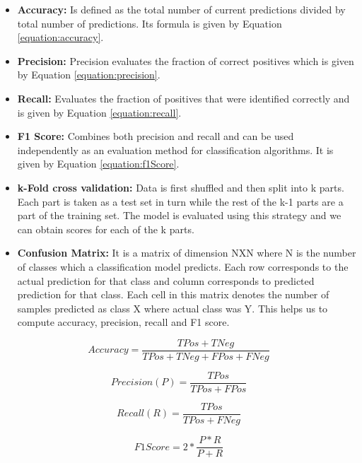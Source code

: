 \begin{itemize}
    \item \textbf{Accuracy:} Is defined as the total number of current predictions divided by total number of predictions. Its formula is given by Equation \ref{equation:accuracy}.
    \item \textbf{Precision:} Precision evaluates the fraction of correct positives which is given by Equation \ref{equation:precision}. 
    \item \textbf{Recall:} Evaluates the fraction of positives that were identified correctly and is given by Equation \ref{equation:recall}.
    \item \textbf{F1 Score:} Combines both precision and recall and can be used independently as an evaluation method for classification algorithms. It is given by Equation \ref{equation:f1Score}.
    \item \textbf{k-Fold cross validation:} Data is first shuffled and then split into k parts. Each part is taken as a test set in turn while the rest of the k-1 parts are a part of the training set. The model is evaluated using this strategy and we can obtain scores for each of the k parts.
    \item \textbf{Confusion Matrix:} It is a matrix of dimension NXN where N is the number of classes which a classification model predicts. Each row corresponds to the actual prediction for that class and column corresponds to predicted prediction for that class. Each cell in this matrix denotes the number of samples predicted as class X where actual class was Y. This helps us to compute accuracy, precision, recall and F1 score.
\end{itemize}

\begin{equation}
\label{equation:accuracy}
    Accuracy = \frac{TPos + TNeg}{TPos + TNeg + FPos + FNeg}
\end{equation}

\begin{equation}
\label{equation:precision}
    Precision(P) = \frac{TPos}{TPos + FPos}
\end{equation}

\begin{equation}
\label{equation:recall}
    Recall(R) = \frac{TPos}{TPos + FNeg}
\end{equation}

\begin{equation}
\label{equation:f1Score}
    F1 Score = 2*\frac{P*R}{P+R}
\end{equation}

